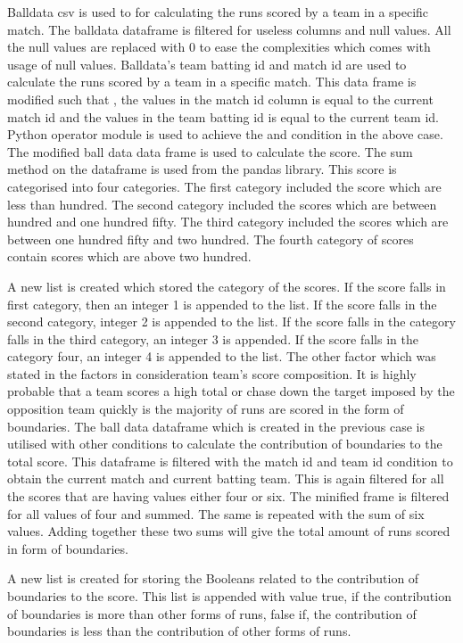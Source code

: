 \documentclass[sigconf]{acmart}
\begin{document}
Balldata csv is used to for calculating the runs scored by a team in a specific match. The balldata dataframe is filtered for useless columns and null values. All the null values are replaced with 0 to ease the complexities which comes with usage of null values. Balldata’s team batting id and match id are used to calculate the runs scored by a team in a specific match. This data frame is modified such that , the values in the match id column is equal to the current match id and the values in the team batting id is equal to the current team id. Python operator module is used to achieve the and condition in the above case. 
The modified ball data data frame is used to calculate the score. The sum method on the dataframe is used from the pandas library. This score is categorised into four categories. The first category included the score which are less than hundred. The second category included the scores which are between hundred and one hundred fifty. The third category included the scores which are between one hundred fifty and two hundred. The fourth category of scores contain scores which are above two hundred. 


A new list is created which stored the category of the scores. If the score falls in first category, then an integer 1 is appended to the list. If the score falls in the second category, integer 2 is appended to the list. If the score falls in the category falls in the third category, an integer 3 is appended. If the score falls in the category four, an integer 4 is appended to the list.
The other factor which was stated in the factors in consideration team’s score composition. It is highly probable that a team scores a high total or chase down the target imposed by the opposition team quickly is the majority of runs are scored in the form of boundaries. The ball data dataframe which is created in the previous case is utilised with other conditions to calculate the contribution of boundaries to the total score. This dataframe is filtered with the match id and team id condition to obtain the current match and current batting team. This is again filtered for all the scores that are having values either four or six. The minified frame is filtered for all values of four and summed. The same is repeated with the sum of six values. Adding together these two sums will give the total amount of runs scored in form of boundaries.

A new list is created for storing the Booleans related to the contribution of boundaries to the score. This list is appended with value true, if the contribution of boundaries is more than other forms of runs, false if, the contribution of boundaries is less than the contribution of other forms of runs.
\end{document}
